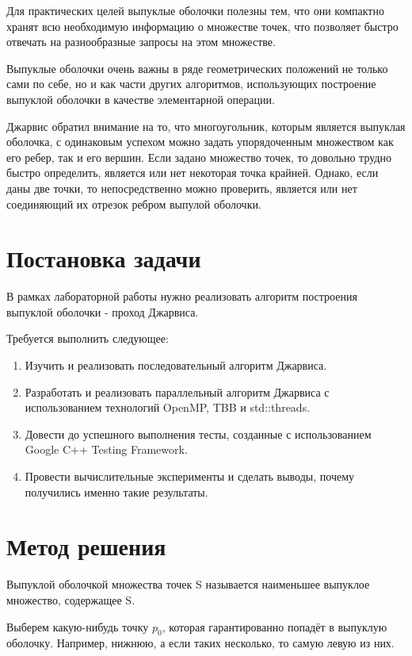 \documentclass{article}
\begin{document}
\par Для практических целей выпуклые оболочки полезны тем, что они компактно хранят всю необходимую информацию о множестве точек, что позволяет быстро отвечать на разнообразные запросы на этом множестве.

\par Выпуклые оболочки очень важны в ряде геометрических положений не только сами по себе, но и как части других алгоритмов, использующих построение выпуклой оболочки в качестве элементарной операции.

\par Джарвис обратил внимание на то, что многоугольник, которым является выпуклая оболочка, с одинаковым успехом можно задать упорядоченным множеством как его ребер, так и его вершин. Если задано множество точек, то довольно трудно быстро определить, является или нет некоторая точка крайней. Однако, если даны две точки, то непосредственно можно проверить, является или нет соединяющий их отрезок ребром выпулой оболочки.

\newpage

\section{Постановка задачи}
В рамках лабораторной работы нужно реализовать алгоритм построения выпуклой оболочки - проход Джарвиса.
\par Требуется выполнить следующее:
\begin{enumerate}
\item Изучить и реализовать последовательный алгоритм Джарвиса.
\item Разработать и реализовать параллельный алгоритм Джарвиса с использованием технологий OpenMP, TBB и std::threads.
\item Довести до успешного выполнения тесты, созданные с использованием Google C++ Testing Framework.
\item Провести вычислительные эксперименты и сделать выводы, почему получились именно такие результаты.
\end{enumerate}

\newpage

\section{Метод решения}
Выпуклой оболочкой множества точек S называется наименьшее
выпуклое множество, содержащее S.

\par Выберем какую-нибудь точку $p_{0}$, которая гарантированно попадёт в выпуклую оболочку. Например, нижнюю, а если таких несколько, то самую левую из них.
\end{document}
